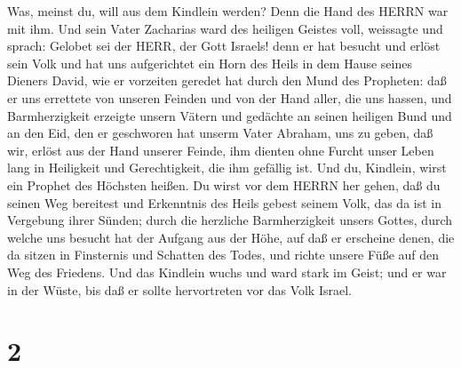 Was, meinst du, will aus dem Kindlein werden? Denn die Hand des HERRN
war mit ihm.  Und sein Vater Zacharias ward des heiligen
Geistes voll, weissagte und sprach:  Gelobet sei der HERR,
der Gott Israels! denn er hat besucht und erlöst sein Volk 
und hat uns aufgerichtet ein Horn des Heils in dem Hause seines Dieners
David,  wie er vorzeiten geredet hat durch den Mund des
Propheten:  daß er uns errettete von unseren Feinden und
von der Hand aller, die uns hassen,  und Barmherzigkeit
erzeigte unsern Vätern und gedächte an seinen heiligen Bund
 und an den Eid, den er geschworen hat unserm Vater
Abraham, uns zu geben,  daß wir, erlöst aus der Hand
unserer Feinde, ihm dienten ohne Furcht unser Leben lang 
in Heiligkeit und Gerechtigkeit, die ihm gefällig ist.  Und
du, Kindlein, wirst ein Prophet des Höchsten heißen. Du wirst vor dem
HERRN her gehen, daß du seinen Weg bereitest  und
Erkenntnis des Heils gebest seinem Volk, das da ist in Vergebung ihrer
Sünden;  durch die herzliche Barmherzigkeit unsers Gottes,
durch welche uns besucht hat der Aufgang aus der Höhe,  auf
daß er erscheine denen, die da sitzen in Finsternis und Schatten des
Todes, und richte unsere Füße auf den Weg des Friedens. 
Und das Kindlein wuchs und ward stark im Geist; und er war in der Wüste,
bis daß er sollte hervortreten vor das Volk Israel.

\hypertarget{section-1}{%
\section{2}\label{section-1}}


